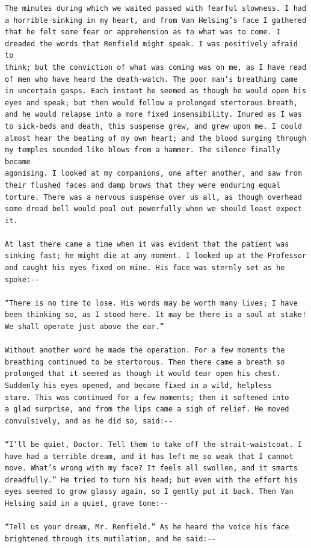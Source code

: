 \documentclass{article}
\begin{document}
\begin{verbatim}
The minutes during which we waited passed with fearful slowness. I had
a horrible sinking in my heart, and from Van Helsing’s face I gathered
that he felt some fear or apprehension as to what was to come. I
dreaded the words that Renfield might speak. I was positively afraid to
think; but the conviction of what was coming was on me, as I have read
of men who have heard the death-watch. The poor man’s breathing came
in uncertain gasps. Each instant he seemed as though he would open his
eyes and speak; but then would follow a prolonged stertorous breath,
and he would relapse into a more fixed insensibility. Inured as I was
to sick-beds and death, this suspense grew, and grew upon me. I could
almost hear the beating of my own heart; and the blood surging through
my temples sounded like blows from a hammer. The silence finally became
agonising. I looked at my companions, one after another, and saw from
their flushed faces and damp brows that they were enduring equal
torture. There was a nervous suspense over us all, as though overhead
some dread bell would peal out powerfully when we should least expect
it.

At last there came a time when it was evident that the patient was
sinking fast; he might die at any moment. I looked up at the Professor
and caught his eyes fixed on mine. His face was sternly set as he
spoke:--

“There is no time to lose. His words may be worth many lives; I have
been thinking so, as I stood here. It may be there is a soul at stake!
We shall operate just above the ear.”

Without another word he made the operation. For a few moments the
breathing continued to be stertorous. Then there came a breath so
prolonged that it seemed as though it would tear open his chest.
Suddenly his eyes opened, and became fixed in a wild, helpless
stare. This was continued for a few moments; then it softened into
a glad surprise, and from the lips came a sigh of relief. He moved
convulsively, and as he did so, said:--

“I’ll be quiet, Doctor. Tell them to take off the strait-waistcoat. I
have had a terrible dream, and it has left me so weak that I cannot
move. What’s wrong with my face? It feels all swollen, and it smarts
dreadfully.” He tried to turn his head; but even with the effort his
eyes seemed to grow glassy again, so I gently put it back. Then Van
Helsing said in a quiet, grave tone:--

“Tell us your dream, Mr. Renfield.” As he heard the voice his face
brightened through its mutilation, and he said:--


\end{verbatim}
\end{document}

